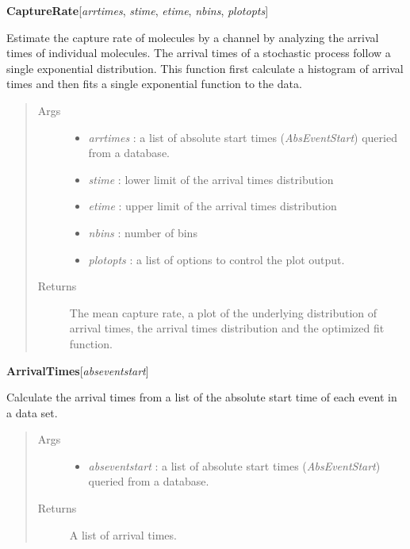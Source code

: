 \documentclass[letterpaper,10pt,english]{sphinxmanual}
\begin{document}
\textbf{CaptureRate}{[}\emph{arrtimes}, \emph{stime}, \emph{etime}, \emph{nbins}, \emph{plotopts}{]}

Estimate the capture rate of molecules by a channel by analyzing the arrival times of individual molecules. The arrival times of a stochastic process follow a single exponential distribution. This function first calculate a histogram of arrival times and then fits a single exponential function to the data.
\begin{quote}\begin{description}
\item[{Args}] \leavevmode\begin{itemize}
\item {} 
\emph{arrtimes} : a list of absolute start times (\emph{AbsEventStart}) queried from a database.

\item {} 
\emph{stime}    : lower limit of the arrival times distribution

\item {} 
\emph{etime}    : upper limit of the arrival times distribution

\item {} 
\emph{nbins}        : number of bins

\item {} 
\emph{plotopts} : a list of options to control the plot output.

\end{itemize}

\item[{Returns}] \leavevmode
The mean capture rate, a plot of the underlying distribution of arrival times, the arrival times distribution and the optimized fit function.

\end{description}\end{quote}

\textbf{ArrivalTimes}{[}\emph{abseventstart}{]}

Calculate the arrival times from a list of the absolute start time of each event in a data set.
\begin{quote}\begin{description}
\item[{Args}] \leavevmode\begin{itemize}
\item {} 
\emph{abseventstart}       : a list of absolute start times (\emph{AbsEventStart}) queried from a database.

\end{itemize}

\item[{Returns}] \leavevmode
A list of arrival times.

\end{description}\end{quote}
\end{document}
